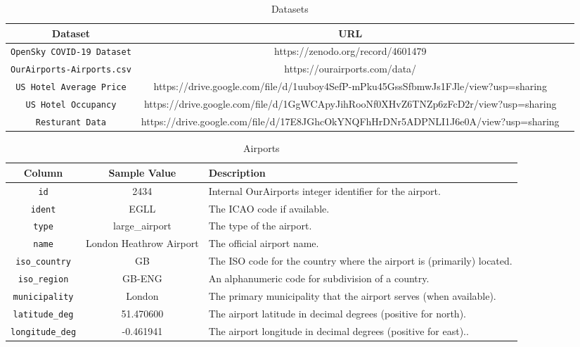 \documentclass[sigconf, nonacm]{acmart}
\begin{document}
\begin{table*}
  \caption{Datasets}
  \label{tab:commands}
  \begin{tabular}{ccl}
    \toprule
    Dataset & URL\\
    \midrule
    \texttt{OpenSky COVID-19 Dataset} & https://zenodo.org/record/4601479\\
    \texttt{OurAirports-Airports.csv} & https://ourairports.com/data/\\
    \texttt{US Hotel Average Price} & https://drive.google.com/file/d/1uuboy4SefP-mPku45GssSfbmwJs1FJle/view?usp=sharing\\
    \texttt{US Hotel Occupancy} & https://drive.google.com/file/d/1GgWCApyJihRooNf0XHvZ6TNZp6zFcD2r/view?usp=sharing\\
    \texttt{Resturant Data} & https://drive.google.com/file/d/17E8JGhcOkYNQFhHrDNr5ADPNLI1J6e0A/view?usp=sharing\\
    \bottomrule
  \end{tabular}
\end{table*}

\begin{table*}
  \caption{Airports}
  \label{tab:commands}
  \begin{tabular}{ccl}
    \toprule
    Column & Sample Value & Description\\
    \midrule
    \texttt{id} & 2434 & Internal OurAirports integer identifier for the airport.\\
    \texttt{ident} & EGLL & The ICAO code if available.\\
    \texttt{type} & large\_airport & The type of the airport.\\
    \texttt{name} & London Heathrow Airport & The official airport name.\\
    \texttt{iso\_country} & GB & The ISO code for the country where the airport is (primarily) located.\\
    \texttt{iso\_region} & GB-ENG  & An alphanumeric code for subdivision of a country.\\
    \texttt{municipality} & London & The primary municipality that the airport serves (when available).\\
    \texttt{latitude\_deg} & 51.470600 & The airport latitude in decimal degrees (positive for north).\\
    \texttt{longitude\_deg} & -0.461941 & The airport longitude in decimal degrees (positive for east)..\\
    \bottomrule
  \end{tabular}
\end{table*}
\end{document}
